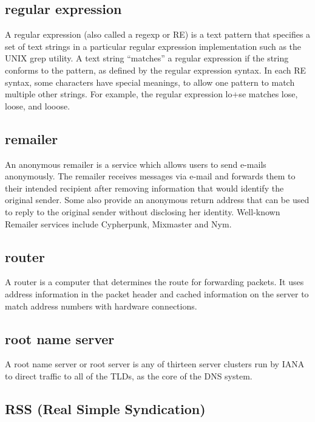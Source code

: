 \subsection{regular expression}

A regular expression (also called a regexp or RE) is a text pattern that
specifies a set of text strings in a particular regular expression
implementation such as the UNIX grep utility. A text string ``matches''
a regular expression if the string conforms to the pattern, as defined
by the regular expression syntax. In each RE syntax, some characters
have special meanings, to allow one pattern to match multiple other
strings. For example, the regular expression lo+se matches lose, loose,
and looose.

\subsection{remailer}

An anonymous remailer is a service which allows users to send e-mails
anonymously. The remailer receives messages via e-mail and forwards them
to their intended recipient after removing information that would
identify the original sender. Some also provide an anonymous return
address that can be used to reply to the original sender without
disclosing her identity. Well-known Remailer services include
Cypherpunk, Mixmaster and Nym.

\subsection{router}

A router is a computer that determines the route for forwarding packets.
It uses address information in the packet header and cached information
on the server to match address numbers with hardware connections.

\subsection{root name server}

A root name server or root server is any of thirteen server clusters run
by IANA to direct traffic to all of the TLDs, as the core of the DNS
system.

\subsection{RSS (Real Simple Syndication)}

